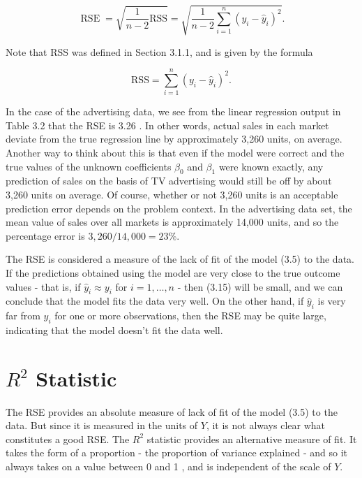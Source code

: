 \documentclass[10pt]{article}
\begin{document}
\begin{equation*}
\operatorname{RSE}=\sqrt{\frac{1}{n-2} \mathrm{RSS}}=\sqrt{\frac{1}{n-2} \sum_{i=1}^{n}\left(y_{i}-\hat{y}_{i}\right)^{2}} . \tag{3.15}
\end{equation*}


Note that RSS was defined in Section 3.1.1, and is given by the formula


\begin{equation*}
\mathrm{RSS}=\sum_{i=1}^{n}\left(y_{i}-\hat{y}_{i}\right)^{2} . \tag{3.16}
\end{equation*}


In the case of the advertising data, we see from the linear regression output in Table 3.2 that the RSE is 3.26 . In other words, actual sales in each market deviate from the true regression line by approximately 3,260 units, on average. Another way to think about this is that even if the model were correct and the true values of the unknown coefficients $\beta_{0}$ and $\beta_{1}$ were known exactly, any prediction of sales on the basis of TV advertising would still be off by about 3,260 units on average. Of course, whether or not 3,260 units is an acceptable prediction error depends on the problem context. In the advertising data set, the mean value of sales over all markets is approximately 14,000 units, and so the percentage error is $3,260 / 14,000=23 \%$.

The RSE is considered a measure of the lack of fit of the model (3.5) to the data. If the predictions obtained using the model are very close to the true outcome values - that is, if $\hat{y}_{i} \approx y_{i}$ for $i=1, \ldots, n$ - then (3.15) will be small, and we can conclude that the model fits the data very well. On the other hand, if $\hat{y}_{i}$ is very far from $y_{i}$ for one or more observations, then the RSE may be quite large, indicating that the model doesn't fit the data well.

\section*{$R^{2}$ Statistic}
The RSE provides an absolute measure of lack of fit of the model (3.5) to the data. But since it is measured in the units of $Y$, it is not always clear what constitutes a good RSE. The $R^{2}$ statistic provides an alternative measure of fit. It takes the form of a proportion - the proportion of variance explained - and so it always takes on a value between 0 and 1 , and is independent of the scale of $Y$.
\end{document}
